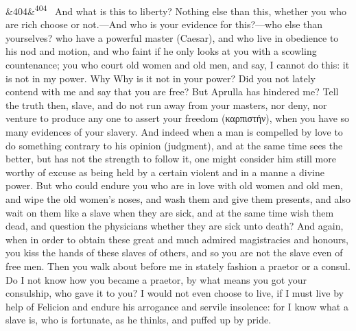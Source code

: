 \documentclass[12pt]{article}
\newcommand{\para}[1][]{\par\noindent\ifx&#1&\else\textsuperscript{\footnotesize #1}~\fi}
\begin{document}
\para[404] And what is this to liberty? Nothing else than this, whether you who are rich choose or not.—And who is your evidence for this?—who else than yourselves? who have a powerful master (Caesar), and who live in obedience to his nod and motion, and who faint if he only looks at you with a scowling countenance; you who court old women and old men, and say, I cannot do this: it is not in my power. Why Why is it not in your power? Did you not lately contend with me and say that you are free? But Aprulla has hindered me? Tell the truth then, slave, and do not run away from your masters, nor deny, nor venture to produce any one to assert your freedom (καρπιστήν), when you have so many evidences of your slavery. And indeed when a man is compelled by love to do something contrary to his opinion (judgment), and at the same time sees the better, but has not the strength to follow it, one might consider him still more worthy of excuse as being held by a certain violent and in a manne a divine power. But who could endure you who are in love with old women and old men, and wipe the old women's noses, and wash them and give them presents, and also wait on them like a slave when they are sick, and at the same time wish them dead, and question the physicians whether they are sick unto death? And again, when in order to obtain these great and much admired magistracies and honours, you kiss the hands of these slaves of others, and so you are not the slave even of free men. Then you walk about before me in stately fashion a praetor or a consul. Do I not know how you became a praetor, by what means you got your consulship, who gave it to you? I would not even choose to live, if I must live by help of Felicion and endure his arrogance and servile insolence: for I know what a slave is, who is fortunate, as he thinks, and puffed up by pride.
\end{document}
